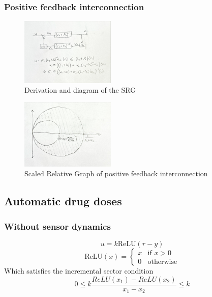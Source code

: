 \documentclass{article}
\begin{document}
\subsubsection{Positive feedback interconnection}

\begin{figure}[H]
    \centering
    \includegraphics[width=0.4\textwidth]{figures/feedback_components.jpg}
    \caption{Derivation and diagram of the SRG }
\end{figure}

\begin{figure}[H]
    \centering
    \includegraphics[width=0.4\textwidth]{figures/feedback_SRG.jpg}
    \caption{Scaled Relative Graph of positive feedback interconnection}
\end{figure}

\subsection{Automatic drug doses}

\subsubsection{Without sensor dynamics}

\begin{equation}
    u = k \text{ReLU}(r - y)
\end{equation}
\begin{equation}
    \text{ReLU}(x) = \begin{cases}
        x & \text{if } x > 0 \\
        0 & \text{otherwise}
    \end{cases}
\end{equation}
Which satisfies the incremental sector condition
\begin{equation}
    0 \leq k \frac{ReLU(x_1) - ReLU(x_2)}{x_1 - x_2} \leq k
\end{equation}
\end{document}
